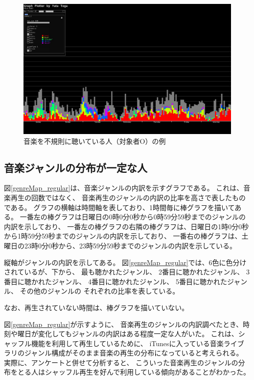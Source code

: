 \documentclass[a4paper, 11pt, onecolumn, report]{jsarticle}
\begin{document}
\begin{figure}[h]
\begin{center}
\includegraphics[width=14cm]{sample_irregular.jpg}
\caption{音楽を不規則に聴いている人（対象者O）の例}
\label{sample_irregular}
\end{center}
\end{figure}

\subsection{音楽ジャンルの分布が一定な人}
図\ref{genreMap_regular}は、音楽ジャンルの内訳を示すグラフである。
これは、音楽再生の回数ではなく、
音楽再生のジャンルの内訳の比率を高さで表したものである。
グラフの横軸は時間軸を表しており、1時間毎に棒グラフを描いてある。
一番左の棒グラフは日曜日の0時0分0秒から0時59分59秒までのジャンルの内訳を示しており、
一番左の棒グラフの右隣の棒グラフは、日曜日の1時0分0秒から1時59分59秒までのジャンルの内訳を示しており、
一番右の棒グラフは、土曜日の23時0分0秒から、23時59分59秒までのジャンルの内訳を示している。

縦軸がジャンルの内訳を示してある。
図\ref{genreMap_regular}では、6色に色分けされているが、下から、
最も聴かれたジャンル、
2番目に聴かれたジャンル、
3番目に聴かれたジャンル、
4番目に聴かれたジャンル、
5番目に聴かれたジャンル、
その他のジャンルの
それぞれの比率を表している。

なお、再生されていない時間は、棒グラフを描いていない。

図\ref{genreMap_regular}が示すように、
音楽再生のジャンルの内訳調べたとき、時刻や曜日が変化してもジャンルの内訳はある程度一定な人がいた。
これは、シャッフル機能を利用して再生しているために、
iTunesに入っている音楽ライブラリのジャンル構成がそのまま音楽の再生の分布になっていると考えられる。
実際に、アンケートと併せて分析すると、
こういった音楽再生のジャンルの分布をとる人はシャッフル再生を好んで利用している傾向があることがわかった。
\end{document}
